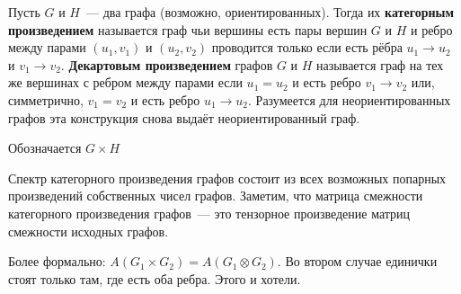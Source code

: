 \dfn 
	Пусть $G$ и $H$~--- два графа (возможно, ориентированных). Тогда их {\bf категорным произведением} называется граф чьи вершины есть пары вершин $G$ и $H$ и ребро между парами $(u_1,v_1)$ и $(u_2,v_2)$ проводится только если есть рёбра $u_1 \to u_2$ и $v_1 \to v_2$. {\bf Декартовым произведением} графов $G$ и $H$ называется граф на тех же вершинах с ребром между парами если $u_1=u_2$ и есть ребро $v_1\to v_2$ или, симметрично, $v_1=v_2$ и есть ребро $u_1 \to u_2$. Разумеется для неориентированных графов эта конструкция снова выдаёт неориентированный граф.

	Обозначается $G\times H$
\edfn


\lm
	Спектр категорного произведения графов состоит из всех возможных попарных произведений собственных чисел графов.
	\proof 
		Заметим, что матрица смежности категорного произведения графов~--- это тензорное произведение матриц смежности исходных графов.

		Более формально: $A(G_1\times G_2) = A(G_1\otimes G_2)$. Во втором случае единички стоят только там, где есть оба ребра. Этого и хотели.
	\endproof
\elm
